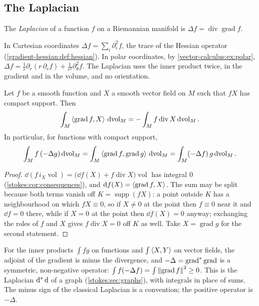 \begin{notechapter}
\section{The Laplacian}\label{vector-calculus:sec:laplacian}

\begin{definition}[Laplacian]\label{vector-calculus:def:laplacian}
The \emph{Laplacian} of a function $f$ on a Riemannian manifold is
$\Delta f = \operatorname{div}\operatorname{grad}f$.
\end{definition}

In Cartesian coordinates $\Delta f = \sum_i\partial_i^2f$, the trace of
the Hessian operator (\cref{gradient-hessian:def:hessian}). In polar
coordinates, by \cref{vector-calculus:ex:polar},
$\Delta f = \frac1r\partial_r(r\,\partial_rf)
+ \frac1{r^2}\partial_\theta^2f$. The Laplacian uses the inner product
twice, in the gradient and in the volume, and no orientation.

\begin{proposition}
\label{vector-calculus:prop:adjoint}
Let $f$ be a smooth function and $X$ a smooth vector field on $M$ such
that $fX$ has compact support. Then
\[
  \int_M\left\langle \operatorname{grad}f, X \right\rangle\,\mathrm{d}\!\operatorname{vol}_M
  = -\int_Mf\operatorname{div}X\,\mathrm{d}\!\operatorname{vol}_M .
\]
In particular, for functions with compact support,
\[
  \int_Mf\,(-\Delta g)\,\mathrm{d}\!\operatorname{vol}_M
  = \int_M\left\langle \operatorname{grad}f, \operatorname{grad}g \right\rangle\,
    \mathrm{d}\!\operatorname{vol}_M
  = \int_M(-\Delta f)\,g\,\mathrm{d}\!\operatorname{vol}_M .
\]
\end{proposition}

\begin{proof}
$\dd(f\,i_X\operatorname{vol})
= \bigl(\dd f(X) + f\operatorname{div}X\bigr)\operatorname{vol}$ has
integral $0$ (\cref{stokes:cor:consequences}), and
$\mathrm{d} f(X) = \left\langle \operatorname{grad}f, X \right\rangle$. The sum may be split
because both terms vanish off $K = \operatorname{supp}(fX)$: a point
outside $K$ has a neighbourhood on which $fX\equiv0$, so if $X\neq0$
at the point then $f\equiv0$ near it and $\dd f = 0$ there, while if
$X = 0$ at the point then $\dd f(X) = 0$ anyway; exchanging the roles
of $f$ and $X$ gives $f\operatorname{div}X = 0$ off $K$ as well. Take
$X = \operatorname{grad}g$ for the second statement.
\end{proof}

\begin{intuition}
For the inner products $\int fg$ on functions and $\int\left\langle X, Y \right\rangle$ on
vector fields, the adjoint of the gradient is minus the divergence,
and $-\Delta = \operatorname{grad}^{*}\operatorname{grad}$ is a
symmetric, non-negative operator:
$\int f(-\Delta f) = \int\left\|\operatorname{grad}f\right\|^2\geq0$. This is
the Laplacian $\mathrm{d}^{*}\,\mathrm{d}$ of a graph (\cref{stokes:sec:graphs}),
with integrals in place of sums. The minus sign of the classical
Laplacian is a convention; the positive operator is $-\Delta$.
\end{intuition}


\end{notechapter}
